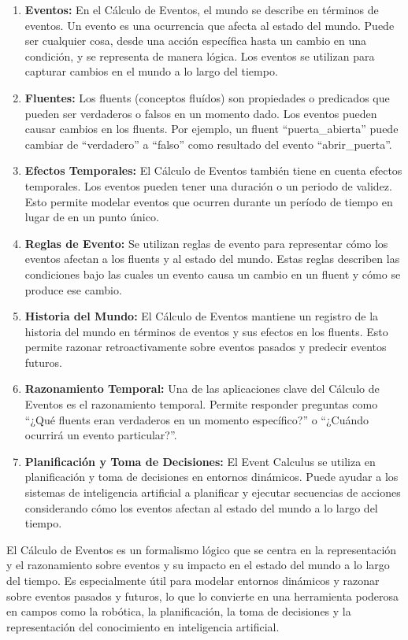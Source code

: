 \begin{enumerate}
  \item \textbf{Eventos: }En el Cálculo de Eventos, el mundo se describe en términos de eventos. Un evento es una ocurrencia que afecta al estado del mundo. Puede ser cualquier cosa, desde una acción específica hasta un cambio en una condición, y se representa de manera lógica. Los eventos se utilizan para capturar cambios en el mundo a lo largo del tiempo.
  \item \textbf{Fluentes: }Los fluents (conceptos fluídos) son propiedades o predicados que pueden ser verdaderos o falsos en un momento dado. Los eventos pueden causar cambios en los fluents. Por ejemplo, un fluent ``puerta\_abierta'' puede cambiar de ``verdadero'' a ``falso'' como resultado del evento ``abrir\_puerta''.
  \item \textbf{Efectos Temporales: }El Cálculo de Eventos también tiene en cuenta efectos temporales. Los eventos pueden tener una duración o un periodo de validez. Esto permite modelar eventos que ocurren durante un período de tiempo en lugar de en un punto único.
  \item \textbf{Reglas de Evento: }Se utilizan reglas de evento para representar cómo los eventos afectan a los fluents y al estado del mundo. Estas reglas describen las condiciones bajo las cuales un evento causa un cambio en un fluent y cómo se produce ese cambio.
  \item \textbf{Historia del Mundo: }El Cálculo de Eventos mantiene un registro de la historia del mundo en términos de eventos y sus efectos en los fluents. Esto permite razonar retroactivamente sobre eventos pasados y predecir eventos futuros.
  \item \textbf{Razonamiento Temporal: }Una de las aplicaciones clave del Cálculo de Eventos es el razonamiento temporal. Permite responder preguntas como ``¿Qué fluents eran verdaderos en un momento específico?'' o ``¿Cuándo ocurrirá un evento particular?''.
  \item \textbf{Planificación y Toma de Decisiones: }El Event Calculus se utiliza en planificación y toma de decisiones en entornos dinámicos. Puede ayudar a los sistemas de inteligencia artificial a planificar y ejecutar secuencias de acciones considerando cómo los eventos afectan al estado del mundo a lo largo del tiempo.
\end{enumerate}

El Cálculo de Eventos es un formalismo lógico que se centra en la representación y el razonamiento sobre eventos y su impacto en el estado del mundo a lo largo del tiempo. Es especialmente útil para modelar entornos dinámicos y razonar sobre eventos pasados y futuros, lo que lo convierte en una herramienta poderosa en campos como la robótica, la planificación, la toma de decisiones y la representación del conocimiento en inteligencia artificial.

